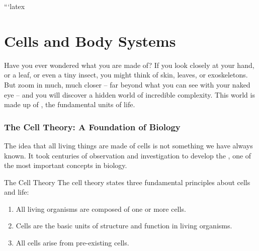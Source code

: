```latex
\chapter{Cells and Body Systems}


\FloatBarrier
\1

Have you ever wondered what you are made of?  If you look closely at your hand, or a leaf, or even a tiny insect, you might think of skin, leaves, or exoskeletons. But zoom in much, much closer – far beyond what you can see with your naked eye – and you will discover a hidden world of incredible complexity.  This world is made up of , the fundamental units of life.


\subsection{The Cell Theory: A Foundation of Biology}

The idea that all living things are made of cells is not something we have always known. It took centuries of observation and investigation to develop the , one of the most important concepts in biology.

\begin{keyconcept}{The Cell Theory}
The cell theory states three fundamental principles about cells and life:
\begin{enumerate}
    \item All living organisms are composed of one or more cells.
    \item Cells are the basic units of structure and function in living organisms.
    \item All cells arise from pre-existing cells.
\end{enumerate}
\end{keyconcept}

